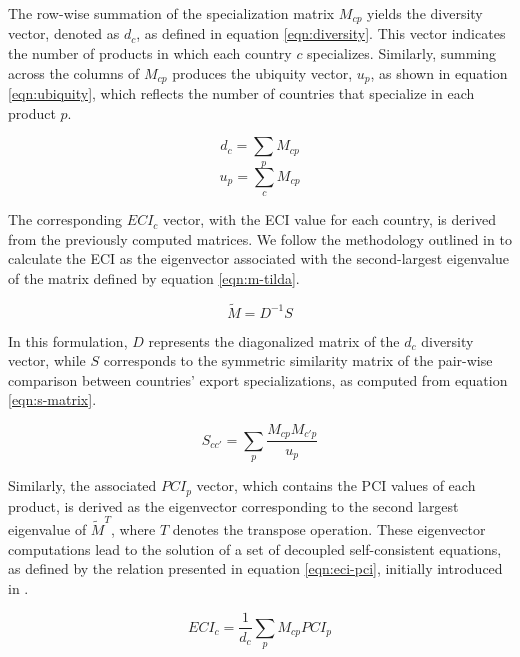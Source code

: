 \documentclass[10pt]{article}
\begin{document}
The row-wise summation of the specialization matrix $M_{cp}$ yields the diversity vector, denoted as $d_{c}$, as defined in equation \eqref{eqn:diversity}. This vector indicates the number of products in which each country $c$ specializes. Similarly, summing across the columns of $M_{cp}$ produces the ubiquity vector, $u_{p}$, as shown in equation \eqref{eqn:ubiquity}, which reflects the number of countries that specialize in each product $p$.

\begin{equation}\label{eqn:diversity}
 d_{c} = \sum_{p}M_{cp}
\end{equation}
\begin{equation}\label{eqn:ubiquity}
 u_{p} = \sum_{c}M_{cp}
\end{equation}

The corresponding $ECI_{c}$ vector, with the ECI value for each country, is derived from the previously computed matrices. We follow the methodology outlined in \citep{mealyInterpretingEconomicComplexity2019} to calculate the ECI as the eigenvector associated with the second-largest eigenvalue of the matrix defined by equation \eqref{eqn:m-tilda}.

\begin{equation}\label{eqn:m-tilda}
 \widetilde{M} = D^{-1}S
\end{equation}

In this formulation, $D$ represents the diagonalized matrix of the $d_{c}$ diversity vector, while $S$ corresponds to the symmetric similarity matrix of the pair-wise comparison between countries' export specializations, as computed from equation \eqref{eqn:s-matrix}.

\begin{equation}\label{eqn:s-matrix}
 S_{cc'} = \sum_{p}\frac{M_{cp}M_{c'p}}{u_{p}}
\end{equation}

Similarly, the associated $PCI_{p}$ vector, which contains the PCI values of each product, is derived as the eigenvector corresponding to the second largest eigenvalue of $\widetilde{M}^{T}$, where $T$ denotes the transpose operation. These eigenvector computations lead to the solution of a set of decoupled self-consistent equations, as defined by the relation presented in equation \eqref{eqn:eci-pci}, initially introduced in \cite{hidalgoBuildingBlocksEconomic2009}.

\begin{equation}\label{eqn:eci-pci}
 ECI_{c} = \frac{1}{d_{c}}\sum_{p}M_{cp}PCI_{p}
\end{equation}
\end{document}
